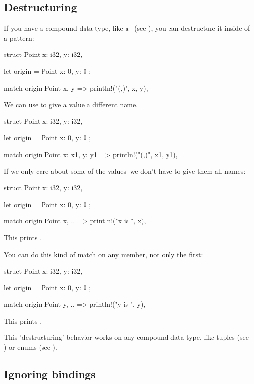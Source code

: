 \subsection*{Destructuring}

If you have a compound data type, like a \struct\ (see ), you can destructure it inside of a pattern:

\begin{rustc}
struct Point {
    x: i32,
    y: i32,
}

let origin = Point { x: 0, y: 0 };

match origin {
    Point { x, y } => println!("({},{})", x, y),
}
\end{rustc}

We can use \code{:} to give a value a different name.

\begin{rustc}
struct Point {
    x: i32,
    y: i32,
}

let origin = Point { x: 0, y: 0 };

match origin {
    Point { x: x1, y: y1 } => println!("({},{})", x1, y1),
}
\end{rustc}

If we only care about some of the values, we don't have to give them all names:

\begin{rustc}
struct Point {
    x: i32,
    y: i32,
}

let origin = Point { x: 0, y: 0 };

match origin {
    Point { x, .. } => println!("x is {}", x),
}
\end{rustc}

This prints .

You can do this kind of match on any member, not only the first:

\begin{rustc}
struct Point {
    x: i32,
    y: i32,
}

let origin = Point { x: 0, y: 0 };

match origin {
    Point { y, .. } => println!("y is {}", y),
}
\end{rustc}

This prints .

\blank

This 'destructuring' behavior works on any compound data type, like tuples (see ) or enums 
(see ).

\subsection*{Ignoring bindings}

